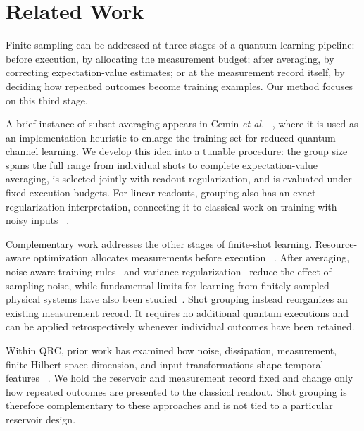 \section{Related Work}
\label{sec:related}

Finite sampling can be addressed at three stages of a quantum learning
pipeline: before execution, by allocating the measurement budget; after
averaging, by correcting expectation-value estimates; or at the measurement
record itself, by deciding how repeated outcomes become training examples. Our
method focuses on this third stage.

A brief instance of subset averaging appears in Cemin \emph{et al.}~
\cite{cemin2024channels}, where it is used as an implementation heuristic to
enlarge the training set for reduced quantum channel learning. We develop this
idea into a tunable procedure: the group size spans the full range from
individual shots to complete expectation-value averaging, is selected jointly
with readout regularization, and is evaluated under fixed execution budgets.
For linear readouts, grouping also has an exact regularization interpretation,
connecting it to classical work on training with noisy inputs~
\cite{bishop1995training}.

Complementary work addresses the other stages of finite-shot learning.
Resource-aware optimization allocates measurements before execution~
\cite{moussa2023resource}. After averaging, noise-aware training rules~
\cite{ahmed2025optimal} and variance regularization~
\cite{kreplin2024reduction} reduce the effect of sampling noise, while
fundamental limits for learning from finitely sampled physical systems have
also been studied~\cite{hu2023tackling}. Shot grouping instead reorganizes an
existing measurement record. It requires no additional quantum executions and
can be applied retrospectively whenever individual outcomes have been retained.

Within QRC, prior work has examined how noise, dissipation, measurement, finite
Hilbert-space dimension, and input transformations shape temporal features~
\cite{kubota2022noise,palacios2024role,kubota2023temporal,
martinezpena2023finite,mujal2023timeseries,suzuki2022natural,
sannia2024dissipation,govia2022nonlinear,martinezpena2023capacity,
kalfus2022hilbert,fry2023noiseinduced,govia2021singleoscillator}. We hold the
reservoir and measurement record fixed and change only how repeated outcomes
are presented to the classical readout. Shot grouping is therefore
complementary to these approaches and is not tied to a particular reservoir
design.
